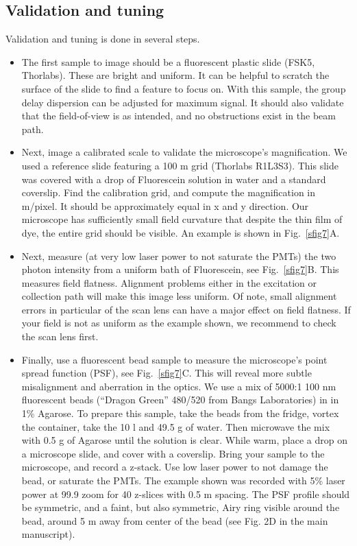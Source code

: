 \documentclass[10pt,letterpaper]{article}
\begin{document}
\subsection{Validation and tuning}
%
Validation and tuning is done in several steps.
\begin{itemize}
    \item The first sample to image should be a fluorescent plastic slide (FSK5, Thorlabs). These are bright and uniform. It can be helpful to scratch the surface of the slide to find a feature to focus on. With this sample, the group delay dispersion can be adjusted for maximum signal. It should also validate that the field-of-view is as intended, and no obstructions exist in the beam path.
    \item Next, image a calibrated scale to validate the microscope's magnification. We used a reference slide featuring a 100 \textmu m grid (Thorlabs R1L3S3). This slide was covered with a drop of Fluorescein solution in water and a standard coverslip. Find the calibration grid, and compute the magnification in \textmu m/pixel. It should be approximately equal in x and y direction. Our microscope has sufficiently small field curvature that despite the thin film of dye, the entire grid should be visible. An example is shown in Fig.~\ref{sfig7}A.
    \item Next, measure (at very low laser power to not saturate the PMTs) the two photon intensity from a uniform bath of Fluorescein, see Fig.~\ref{sfig7}B. This measures field flatness. Alignment problems either in the excitation or collection path will make this image less uniform. Of note, small alignment errors in particular of the scan lens can have a major effect on field flatness. If your field is not as uniform as the example shown, we recommend to check the scan lens first.
    \item Finally, use a fluorescent bead sample to measure the microscope's point spread function (PSF), see Fig.~\ref{sfig7}C. This will reveal more subtle misalignment and aberration in the optics. We use a mix of 5000:1 100 nm fluorescent beads (``Dragon Green'' 480/520 from Bangs Laboratories) in in 1\% Agarose. To prepare this sample, take the beads from the fridge, vortex the container, take the 10 \textmu l and 49.5 g of water. Then microwave the mix with 0.5 g of Agarose until the solution is clear. While warm, place a drop on a microscope slide, and cover with a coverslip. Bring your sample to the microscope, and record a z-stack. Use low laser power to not damage the bead, or saturate the PMTs. The example shown was recorded with 5\% laser power at 99.9 zoom for 40 z-slices with 0.5 \textmu m spacing. The PSF profile should be symmetric, and a faint, but also symmetric, Airy ring visible around the bead, around 5 \textmu m away from center of the bead (see Fig. 2D in the main manuscript).
\end{itemize}
\end{document}
